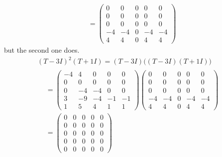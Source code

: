 \begin{exercises}
\begin{answer}
\begin{exparts}
\begin{align*}
           &=
           \begin{pmatrix} 
               0   &0    &0    &0    &0    \\
               0   &0    &0    &0    &0    \\
               0   &0    &0    &0    &0    \\
              -4   &-4   &0    &-4   &-4   \\
               4   &4    &0    &4    &4  
           \end{pmatrix}           
         \end{align*}
         but the second one does.
         \begin{multline*}
           (T-3I)^2(T+1I)=(T-3I)\bigl((T-3I)(T+1I)\bigr) \\
           \begin{aligned}
           &=
           \begin{pmatrix} 
              -4   &4    &0    &0    &0    \\
               0   &0    &0    &0    &0    \\
               0   &-4   &-4   &0    &0    \\
               3   &-9   &-4   &-1   &-1   \\
               1   &5    &4    &1    &1  
           \end{pmatrix}     
           \begin{pmatrix} 
               0   &0    &0    &0    &0    \\
               0   &0    &0    &0    &0    \\
               0   &0    &0    &0    &0    \\
              -4   &-4   &0    &-4   &-4   \\
               4   &4    &0    &4    &4  
           \end{pmatrix}                          \\          
           &=
           \begin{pmatrix} 
               0   &0    &0    &0    &0    \\
               0   &0    &0    &0    &0    \\
               0   &0    &0    &0    &0    \\
               0   &0    &0    &0    &0    \\
               0   &0    &0    &0    &0  
           \end{pmatrix}  
           \end{aligned}         

\end{multline*}
\end{exparts}
\end{answer}
\end{exercises}
